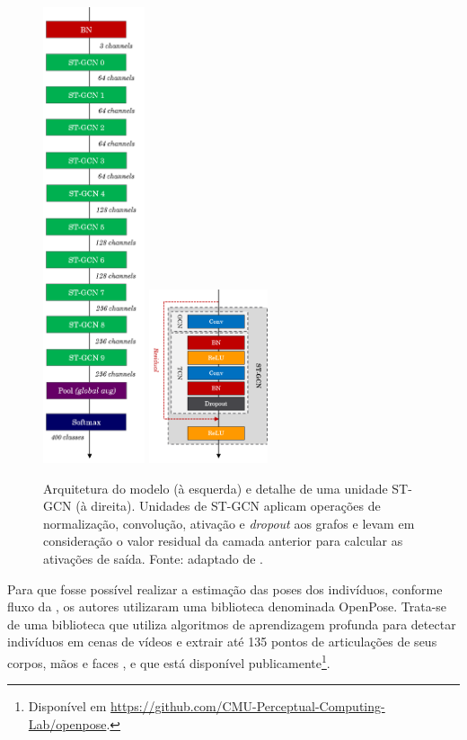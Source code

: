 \begin{figure}[ht]
    \centering
    \includegraphics[width=3.0cm]{images/st_gcn_architecture}
    \includegraphics[width=3.5cm]{images/st_gcn_architeture_unit}
    \caption{Arquitetura do modelo (à esquerda) e detalhe de uma unidade ST-GCN (à direita). Unidades de ST-GCN aplicam operações de normalização, convolução, ativação e \textit{dropout} aos grafos e levam em consideração o valor residual da camada anterior para calcular as ativações de saída. Fonte: adaptado de \cite{st-gcn-2018}.}
    \label{fig:st-gcn-architecture}
\end{figure}


Para que fosse possível realizar a estimação das poses dos indivíduos, conforme fluxo da , os autores utilizaram uma biblioteca denominada OpenPose. Trata-se de uma biblioteca que utiliza algoritmos de aprendizagem profunda para detectar indivíduos em cenas de vídeos e extrair até 135 pontos de articulações de seus corpos, mãos e faces \cite{cao-realtime-2017, simon-hand-2017, wei-cpm-2016}, e que está disponível publicamente\footnote{
    Disponível em \url{https://github.com/CMU-Perceptual-Computing-Lab/openpose}.
}.

